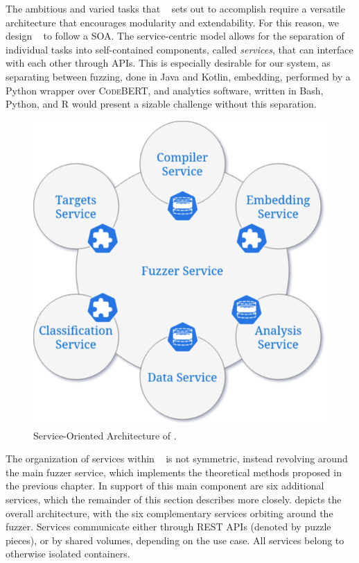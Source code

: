 The ambitious and varied tasks that \kf~ sets out to accomplish
require a versatile architecture that encourages modularity
and extendability.
For this reason, we design \kf~ to follow a \gls{SOA}.
The service-centric model allows for the separation of
individual tasks into self-contained components, called
\textit{services}, that can interface with each other
through APIs.
This is especially desirable for our system, as separating between
fuzzing, done in Java and Kotlin, embedding, performed by a Python
wrapper over \textsc{CodeBERT}, and analytics software, written
in Bash, Python, and R would present a sizable challenge
without this separation.


\begin{figure}[t]
\centering
\includegraphics[scale=0.3]{img/services.png}
\caption{Service-Oriented Architecture of \kf.}
\label{fig:services}
\end{figure}

The organization of services within \kf~ is not symmetric,
instead revolving around the main fuzzer service, which implements the
theoretical methods proposed in the previous chapter.
In support of this main component are six additional services, which the remainder of
this section describes more closely.
 depicts the overall architecture, with the six complementary
services orbiting around the fuzzer.
Services communicate either through REST APIs (denoted by puzzle pieces),
or by shared volumes, depending on the use case.
All services belong to otherwise isolated containers.


